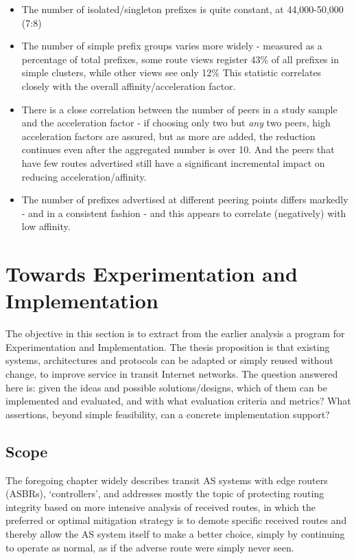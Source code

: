 \begin{itemize}
	\item The number of isolated/singleton prefixes is quite constant, at 44,000-50,000 (7:8)
	\item The number of simple prefix groups varies more widely - measured as a percentage of total prefixes, some route views register 43\% of all prefixes in simple clusters, while other views see only 12\%\! This statistic correlates closely with the overall affinity/acceleration factor.
	\item There is a close correlation between the number of peers in a study sample and the acceleration factor - if choosing only two but \emph{any} two peers, high acceleration factors are assured, but as more are added, the reduction continues even after the aggregated number is over 10. And the peers that have few routes advertised still have a significant incremental impact on reducing acceleration/affinity.
	\item The number of prefixes advertised at different peering points differs markedly - and in a consistent fashion - and this appears to correlate (negatively) with low affinity.
\end{itemize}

\section{Towards Experimentation and Implementation}

The objective in this section is to extract from the earlier analysis a program for Experimentation and Implementation.  The thesis proposition is that existing systems, architectures and protocols can be adapted or simply reused without change, to improve service in transit Internet networks.  The question answered here is: given the ideas and possible solutions/designs, which of them can be implemented and evaluated, and with what evaluation criteria and metrics?  What assertions, beyond simple feasibility, can a concrete implementation support?

\subsection{Scope}
The foregoing chapter widely describes transit AS systems with edge routers (ASBRs), `controllers', and addresses mostly the topic of protecting routing integrity based on more intensive analysis of received routes, in which the preferred or optimal mitigation strategy is to demote specific received routes and thereby allow the AS system itself to make a better choice, simply by continuing to operate as normal, as if the adverse route were simply never seen.

